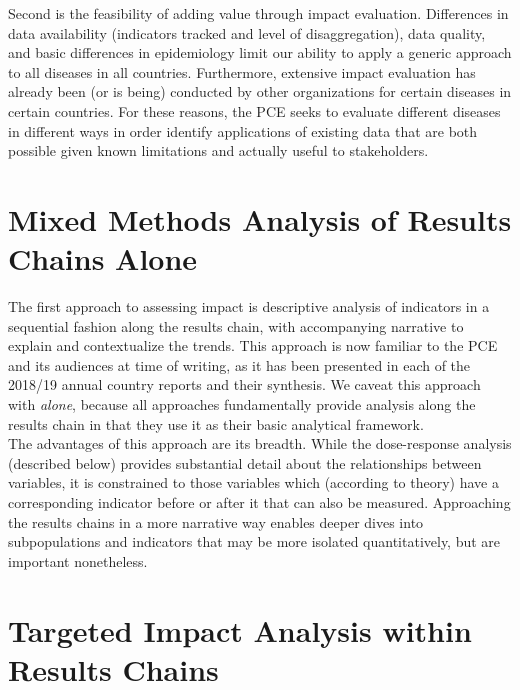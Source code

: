 \documentclass[twocolumn]{bmcart}%
\begin{document}
Second is the feasibility of adding value through impact evaluation. Differences in data availability (indicators tracked and level of disaggregation), data quality, and basic differences in epidemiology limit our ability to apply a generic approach to all diseases in all countries. Furthermore, extensive impact evaluation has already been (or is being) conducted by other organizations for certain diseases in certain countries. For these reasons, the PCE seeks to evaluate different diseases in different ways in order identify applications of existing data that are both possible given known limitations and actually useful to stakeholders. \\


\section{Mixed Methods Analysis of Results Chains Alone}
The first approach to assessing impact is descriptive analysis of indicators in a sequential fashion along the results chain, with accompanying narrative to explain and contextualize the trends. This approach is now familiar to the PCE and its audiences at time of writing, as it has been presented in each of the 2018/19 annual country reports and their synthesis. We caveat this approach with \textit{alone}, because all approaches fundamentally provide analysis along the results chain in that they use it as their basic analytical framework. \\

The advantages of this approach are its breadth. While the dose-response analysis (described below) provides substantial detail about the relationships between variables, it is constrained to those variables which (according to theory) have a corresponding indicator before or after it that can also be measured. Approaching the results chains in a more narrative way enables deeper dives into subpopulations and indicators that may be more isolated quantitatively, but are important nonetheless. \\


\section{Targeted Impact Analysis within Results Chains}
\end{document}

